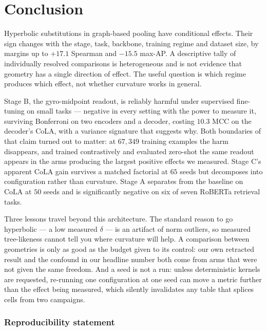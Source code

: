 \documentclass{article}
\begin{document}
\section{Conclusion}

Hyperbolic substitutions in graph-based pooling have conditional effects. Their
sign changes with the stage, task, backbone, training regime and dataset size,
by margins up to $+17.1$ Spearman and $-15.5$ max-AP. A descriptive tally of
individually resolved comparisons is heterogeneous and is not evidence that
geometry has a single direction of effect. The useful question is which regime
produces which effect, not whether curvature works in general.

Stage B, the gyro-midpoint readout, is reliably harmful under supervised
fine-tuning on small tasks --- negative in every setting with the power to
measure it, surviving Bonferroni on two encoders and a decoder, costing $10.3$
MCC on the decoder's CoLA, with a variance signature that suggests why. Both
boundaries of that claim turned out to matter: at $67{,}349$ training examples
the harm disappears, and trained contrastively and evaluated zero-shot the same
readout appears in the arms producing the largest positive effects we measured.
Stage C's apparent CoLA gain survives a matched factorial at $65$ seeds but
decomposes into configuration rather than curvature. Stage A separates from the
baseline on CoLA at $50$ seeds and is significantly negative on six of seven
RoBERTa retrieval tasks.

Three lessons travel beyond this architecture. The standard reason to go
hyperbolic --- a low measured $\delta$ --- is an artifact of norm outliers, so
measured tree-likeness cannot tell you where curvature will help. A comparison
between geometries is only as good as the budget given to its control: our own
retracted result and the confound in our headline number both come from arms
that were not given the same freedom. And a seed is not a run: unless
deterministic kernels are requested, re-running one configuration at one seed
can move a metric further than the effect being measured, which silently
invalidates any table that splices cells from two campaigns.

\subsubsection*{Reproducibility statement}
\end{document}
